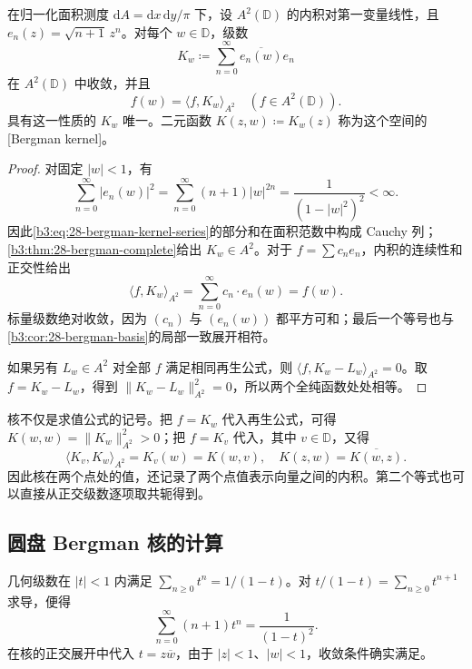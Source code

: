 \begin{proposition}\label{b3:prop:28-bergman-kernel-construction}
在归一化面积测度 \(\mathrm{d}A=\mathrm{d}x\,\mathrm{d}y/\pi\) 下，设 \(A^2(\mathbb D)\) 的内积对第一变量线性，且 \(e_n(z)=\sqrt{n+1}\,z^n\)。对每个 \(w\in\mathbb D\)，级数
\begin{equation}\label{b3:eq:28-bergman-kernel-series}
 K_w\coloneqq\sum_{n=0}^{\infty}\overline{e_n(w)}e_n
\end{equation}
在 \(A^2(\mathbb D)\) 中收敛，并且
\begin{equation}\label{b3:eq:28-bergman-reproduction}
 f(w)=\langle f,K_w\rangle_{A^2}
 \quad(f\in A^2(\mathbb D)).
\end{equation}
具有这一性质的 \(K_w\) 唯一。二元函数 \(K(z,w)\coloneqq K_w(z)\) 称为这个空间的[Bergman kernel]。
\end{proposition}
\begin{proof}
对固定 \(|w|<1\)，有
\[
 \sum_{n=0}^{\infty}|e_n(w)|^2
 =\sum_{n=0}^{\infty}(n+1)|w|^{2n}
 =\frac1{(1-|w|^2)^2}<\infty.
\]
因此\eqref{b3:eq:28-bergman-kernel-series}的部分和在面积范数中构成 Cauchy 列；\cref{b3:thm:28-bergman-complete}给出 \(K_w\in A^2\)。对于 \(f=\sum c_ne_n\)，内积的连续性和正交性给出
\[
 \langle f,K_w\rangle_{A^2}
 =\sum_{n=0}^{\infty}c_n\cdot e_n(w)=f(w).
\]
标量级数绝对收敛，因为 \((c_n)\) 与 \((e_n(w))\) 都平方可和；最后一个等号也与\cref{b3:cor:28-bergman-basis}的局部一致展开相符。

如果另有 \(L_w\in A^2\) 对全部 \(f\) 满足相同再生公式，则 \(\langle f,K_w-L_w\rangle_{A^2}=0\)。取 \(f=K_w-L_w\)，得到 \(\|K_w-L_w\|_{A^2}^2=0\)，所以两个全纯函数处处相等。
\end{proof}

核不仅是求值公式的记号。把 \(f=K_w\) 代入再生公式，可得 \(K(w,w)=\|K_w\|_{A^2}^2>0\)；把 \(f=K_v\) 代入，其中 \(v\in\mathbb D\)，又得
\[
 \langle K_v,K_w\rangle_{A^2}=K_v(w)=K(w,v),
 \quad K(z,w)=\overline{K(w,z)}.
\]
因此核在两个点处的值，还记录了两个点值表示向量之间的内积。第二个等式也可以直接从正交级数逐项取共轭得到。

\subsection{圆盘 Bergman 核的计算}
\label{b3:subsec:280502}

几何级数在 \(|t|<1\) 内满足 \(\sum_{n\ge0}t^n=1/(1-t)\)。对 \(t/(1-t)=\sum_{n\ge0}t^{n+1}\) 求导，便得
\[
 \sum_{n=0}^{\infty}(n+1)t^n=\frac1{(1-t)^2}.
\]
在核的正交展开中代入 \(t=z\overline w\)，由于 \(|z|<1\)、\(|w|<1\)，收敛条件确实满足。

